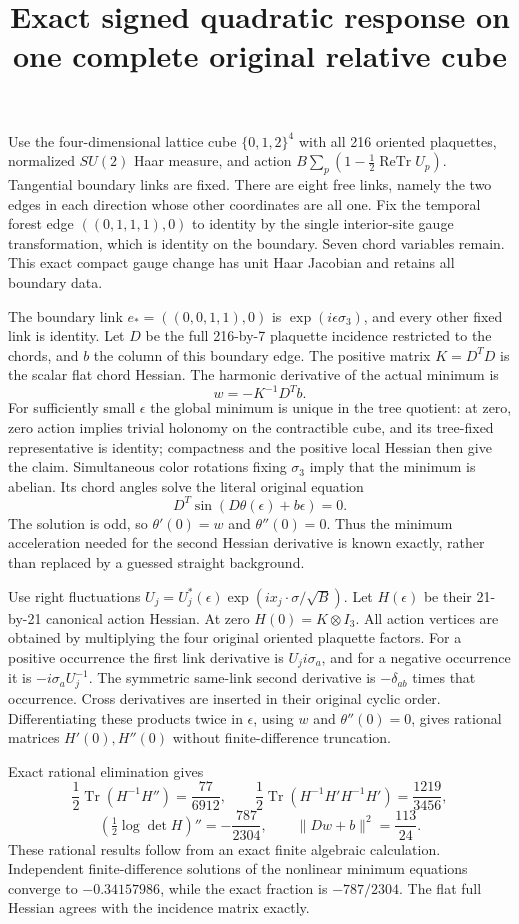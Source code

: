 \documentclass[11pt]{article}
\title{Exact signed quadratic response on one complete original relative cube}\author{}\date{}
\begin{document}
\maketitle
Use the four-dimensional lattice cube $\{0,1,2\}^4$ with all 216 oriented
plaquettes, normalized $SU(2)$ Haar measure, and action
$B\sum_p(1-\frac12\operatorname{ReTr}U_p)$. Tangential boundary links
are fixed. There are eight free links, namely the two edges in each
direction whose other coordinates are all one. Fix the temporal forest
edge $((0,1,1,1),0)$ to identity by the single interior-site gauge
transformation, which is identity on the boundary. Seven chord variables
remain. This exact compact gauge change has unit Haar Jacobian and retains
all boundary data.

The boundary link $e_*=((0,0,1,1),0)$ is
$\exp(i\epsilon\sigma_3)$, and every other fixed link is identity.
Let $D$ be the full 216-by-7 plaquette incidence restricted to the chords,
and $b$ the column of this boundary edge. The positive matrix $K=D^TD$
is the scalar flat chord Hessian. The harmonic derivative of the actual
minimum is
\[
 w=-K^{-1}D^Tb.
\]
For sufficiently small $\epsilon$ the global minimum is unique in the
tree quotient: at zero, zero action implies trivial holonomy on the
contractible cube, and its tree-fixed representative is identity;
compactness and the positive local Hessian then give the claim.
Simultaneous color rotations fixing $\sigma_3$ imply that the minimum is
abelian. Its chord angles solve the literal original equation
\[
 D^T\sin(D\theta(\epsilon)+b\epsilon)=0.
\]
The solution is odd, so $\theta'(0)=w$ and $\theta''(0)=0$.
Thus the minimum acceleration needed for the second Hessian derivative
is known exactly, rather than replaced by a guessed straight background.

Use right fluctuations $U_j=U_j^*(\epsilon)\exp(i x_j\cdot\sigma/\sqrt B)$.
Let $H(\epsilon)$ be their 21-by-21 canonical action Hessian.
At zero $H(0)=K\otimes I_3$. All action vertices are obtained by multiplying
the four original oriented plaquette factors. For a positive occurrence
the first link derivative is $U_j i\sigma_a$, and for a negative occurrence
it is $-i\sigma_a U_j^{-1}$. The symmetric same-link second derivative is
$-\delta_{ab}$ times that occurrence. Cross derivatives are inserted in
their original cyclic order. Differentiating these products twice in
$\epsilon$, using $w$ and $\theta''(0)=0$, gives rational matrices
$H'(0),H''(0)$ without finite-difference truncation.

Exact rational elimination gives
\[
 \frac12\operatorname{Tr}(H^{-1}H'')=\frac{77}{6912},\qquad
 \frac12\operatorname{Tr}(H^{-1}H'H^{-1}H')=\frac{1219}{3456},
\]
\[
 \boxed{\quad
 \left(\tfrac12\log\det H\right)''=-\frac{787}{2304},\qquad
 \|Dw+b\|^2=\frac{113}{24}.\quad}
\]
These rational results follow from an exact finite algebraic calculation.
Independent finite-difference solutions of the nonlinear minimum equations
converge to $-0.34157986$, while the exact fraction is $-787/2304$.
The flat full Hessian agrees with the incidence matrix exactly.
\end{document}
